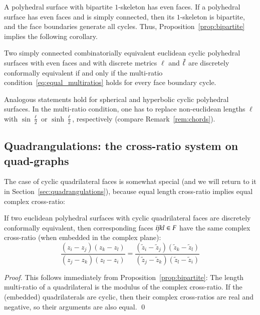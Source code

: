 \documentclass[Thesis]{subfiles}
\begin{document}
A polyhedral surface with bipartite $1$-skeleton has even faces. If a
polyhedral surface has even faces and is simply connected, then its
$1$-skeleton is bipartite, and the face boundaries generate all
cycles. Thus, Proposition~\ref{prop:bipartite} implies the following
corollary.

\begin{corollary}
  \label{cor:simply_connected_bipartite}
  Two simply connected combinatorially equivalent euclidean cyclic
  polyhedral surfaces with even faces and with discrete metrics $\ell$
  and $\tilde{\ell}$ are discretely conformally equivalent if and only
  if the multi-ratio condition~\eqref{eq:equal_multiratios} holds for
  every face boundary cycle.
\end{corollary}

\begin{remark}
  Analogous statements hold for spherical and hyperbolic cyclic
  polyhedral surfaces. In the multi-ratio condition, one has to replace
  non-euclidean lengths $\ell$ with $\sin\frac{\ell}{2}$ or
  $\sinh\frac{\ell}{2}$, respectively (compare
  Remark~\ref{rem:chords}).
\end{remark}

\subsection{Quadrangulations: the cross-ratio system on quad-graphs}
\label{sec:quads}

The case of cyclic quadrilateral faces is somewhat special (and we
will return to it in Section~\ref{sec:quadrangulations}), because
equal length cross-ratio implies equal complex cross-ratio:

\begin{proposition}
  \label{prop:quad}
  If two euclidean polyhedral surfaces with cyclic quadrilateral faces
  are discretely conformally equivalent, then corresponding faces ${\it
  ijkl}\in F$ have the same complex cross-ratio (when embedded in the
  complex plane):
  \begin{equation*}
    \frac{(z_{i}-z_{j})(z_{k}-z_{l})}{(z_{j}-z_{k})(z_{l}-z_{i})}=
    \frac{(\tilde z_{i}-\tilde z_{j})(\tilde z_{k}-\tilde z_{l})}{(\tilde z_{j}-\tilde z_{k})(\tilde z_{l}- \tilde z_{i})}
  \end{equation*}
\end{proposition}

\begin{proof}
  This follows immediately from Proposition~\ref{prop:bipartite}: The
  length multi-ratio of a quadrilateral is the modulus of the complex
  cross-ratio. If the (embedded) quadrilaterals are cyclic, then their
  complex cross-ratios are real and negative, so their arguments are
  also equal.
  \qed
\end{proof}
\end{document}

